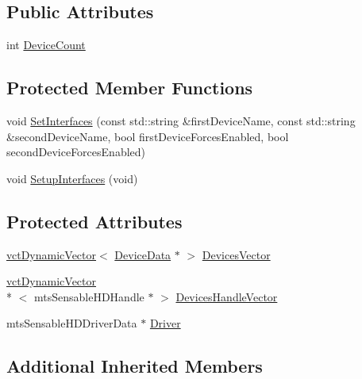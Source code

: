 \subsection*{Public Attributes}
\begin{DoxyCompactItemize}
\item 
int \hyperlink{classmts_sensable_h_d_a75a41334d77a8db7e0913e9d5ca0483d}{Device\-Count}
\end{DoxyCompactItemize}
\subsection*{Protected Member Functions}
\begin{DoxyCompactItemize}
\item 
void \hyperlink{classmts_sensable_h_d_ada94e86f257a11e1df347dc003eb0bba}{Set\-Interfaces} (const std\-::string \&first\-Device\-Name, const std\-::string \&second\-Device\-Name, bool first\-Device\-Forces\-Enabled, bool second\-Device\-Forces\-Enabled)
\item 
void \hyperlink{classmts_sensable_h_d_a4bb52aba80991b43e4692fdbbdf97e6b}{Setup\-Interfaces} (void)
\end{DoxyCompactItemize}
\subsection*{Protected Attributes}
\begin{DoxyCompactItemize}
\item 
\hyperlink{classvct_dynamic_vector}{vct\-Dynamic\-Vector}$<$ \hyperlink{structmts_sensable_h_d_1_1_device_data}{Device\-Data} $\ast$ $>$ \hyperlink{classmts_sensable_h_d_a0c8ea80df145268d76c57d99ca5820e3}{Devices\-Vector}
\item 
\hyperlink{classvct_dynamic_vector}{vct\-Dynamic\-Vector}\\*
$<$ mts\-Sensable\-H\-D\-Handle $\ast$ $>$ \hyperlink{classmts_sensable_h_d_addc29ab0005b52b7c220957338fd13b0}{Devices\-Handle\-Vector}
\item 
mts\-Sensable\-H\-D\-Driver\-Data $\ast$ \hyperlink{classmts_sensable_h_d_abdb150f4135097e1530e967a8b4c9b8c}{Driver}
\end{DoxyCompactItemize}
\subsection*{Additional Inherited Members}


